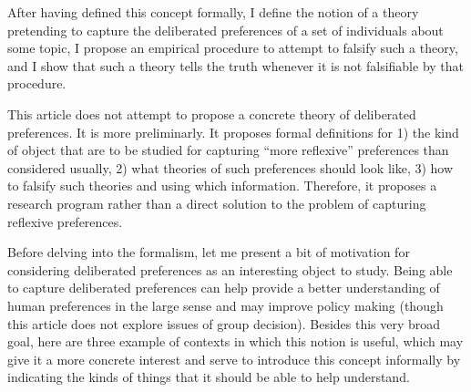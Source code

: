 \documentclass[version=last, pagesize, twoside=off, bibliography=totoc, DIV=calc, fontsize=12pt, a4paper, french, english]{scrartcl}
\begin{document}
After having defined this concept formally, I define the notion of a theory pretending to capture the deliberated preferences of a set of individuals about some topic, I propose an empirical procedure to attempt to falsify such a theory, and I show that such a theory tells the truth whenever it is not falsifiable by that procedure.

This article does not attempt to propose a concrete theory of deliberated preferences. It is more preliminarly. It proposes formal definitions for 1) the kind of object that are to be studied for capturing “more reflexive” preferences than considered usually, 2) what theories of such preferences should look like, 3) how to falsify such theories and using which information. Therefore, it proposes a research program rather than a direct solution to the problem of capturing reflexive preferences.

Before delving into the formalism, let me present a bit of motivation for considering deliberated preferences as an interesting object to study.
Being able to capture deliberated preferences can help provide a better understanding of human preferences in the large sense and may improve policy making (though this article does not explore issues of group decision). Besides this very broad goal, here are three example of contexts in which this notion is useful, which may give it a more concrete interest and serve to introduce this concept informally by indicating the kinds of things that it should be able to help understand.
\end{document}
